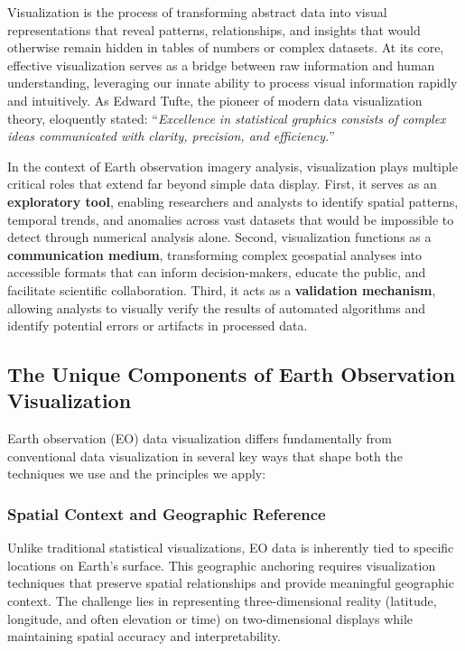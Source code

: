 Visualization is the process of transforming abstract data into visual representations that reveal patterns, relationships, and insights that would otherwise remain hidden in tables of numbers or complex datasets. At its core, effective visualization serves as a bridge between raw information and human understanding, leveraging our innate ability to process visual information rapidly and intuitively. As Edward Tufte, the pioneer of modern data visualization theory, eloquently stated: ``\textit{Excellence in statistical graphics consists of complex ideas communicated with clarity, precision, and efficiency.}'' \citep{Tufte2001}

In the context of Earth observation imagery analysis, visualization plays multiple critical roles that extend far beyond simple data display. First, it serves as an \textbf{exploratory tool}, enabling researchers and analysts to identify spatial patterns, temporal trends, and anomalies across vast datasets that would be impossible to detect through numerical analysis alone. Second, visualization functions as a \textbf{communication medium}, transforming complex geospatial analyses into accessible formats that can inform decision-makers, educate the public, and facilitate scientific collaboration. Third, it acts as a \textbf{validation mechanism}, allowing analysts to visually verify the results of automated algorithms and identify potential errors or artifacts in processed data.

\subsection{The Unique Components of Earth Observation Visualization}

Earth observation (EO) data visualization differs fundamentally from conventional data visualization in several key ways that shape both the techniques we use and the principles we apply:

\subsubsection{Spatial Context and Geographic Reference}

Unlike traditional statistical visualizations, EO data is inherently tied to specific locations on Earth's surface. This geographic anchoring requires visualization techniques that preserve spatial relationships and provide meaningful geographic context. The challenge lies in representing three-dimensional reality (latitude, longitude, and often elevation or time) on two-dimensional displays while maintaining spatial accuracy and interpretability.


